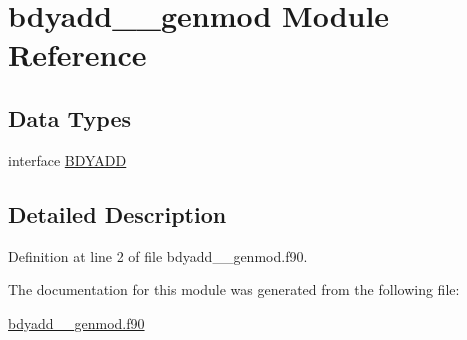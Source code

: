 \hypertarget{classbdyadd____genmod}{\section{bdyadd\+\_\+\+\_\+genmod Module Reference}
\label{classbdyadd____genmod}
}
\subsection*{Data Types}
\begin{DoxyCompactItemize}
\item 
interface \hyperlink{interfacebdyadd____genmod_1_1BDYADD}{B\+D\+Y\+A\+D\+D}
\end{DoxyCompactItemize}


\subsection{Detailed Description}


Definition at line 2 of file bdyadd\+\_\+\+\_\+genmod.\+f90.



The documentation for this module was generated from the following file\+:\begin{DoxyCompactItemize}
\item 
\hyperlink{bdyadd____genmod_8f90}{bdyadd\+\_\+\+\_\+genmod.\+f90}\end{DoxyCompactItemize}
